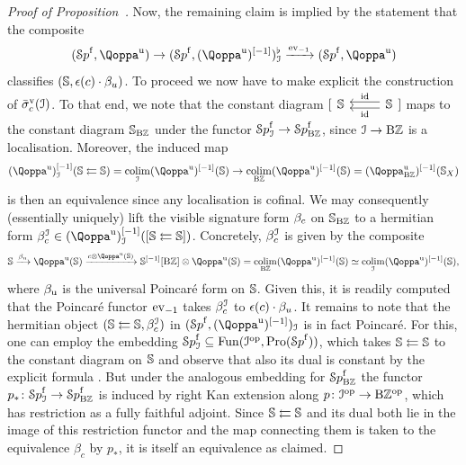 \begin{proof}[Proof of Proposition~]
Now, the remaining claim is implied by the statement that the
composite
\[
(\Spaf,\QF^\uni) \to (\Spaf,(\QF^\uni)\qshift{-1})_\I^\flat \xrightarrow{\ev_{-1}} (\Spaf,\QF^\uni)
\]
classifies $(\mathbb{S},\epsilon(c)\cdot \beta_u)$. To proceed we now have to make explicit the construction of $\bar{\sigma}^{\mathrm{v}}_c(\mathcal{I})$.
To that end, we note that the constant diagram $[\begin{tikzcd} \SS & \SS \ar[l,shift left,"\id"] \ar[l, shift right,"\id"'] \end{tikzcd}]$
maps to 
the constant diagram $\mathbb{S}_{\mathrm{B}\mathbb{Z}}$ under the functor ${\mathcal Sp}^{\mathrm{f}}_{\mathcal{I}} \to {\mathcal Sp}^{\mathrm{f}}_{\mathrm{B}\mathbb{Z}}$, since $\mathcal{I} \to \mathrm{B}\mathbb{Z}$ is a localisation. %
Moreover, the induced map
\[
(\QF^{\uni})\qshift{-1}_\I(\SS \leftleftarrows \SS) =  \colim_\I (\QF^{\uni})\qshift{-1}(\SS) \to  \colim_{\B\ZZ}(\QF^{\uni})\qshift{-1}(\SS) = (\QF^{\uni}_{\B\ZZ})\qshift{-1}(\SS_X)
\]
is then an equivalence since any localisation is cofinal. %
We may consequently (essentially uniquely) lift the visible signature form $\beta_{c}$ on $\mathbb{S}_{\mathrm{B}\mathbb{Z}}$ to a hermitian form $\bet^\I_c \in (\QF^{\uni})\qshift{-1}_\I([\SS \leftleftarrows \SS])$. Concretely, $\beta^{\mathcal{I}}_c$ is given by the composite
\begin{equation}
\label{equation:beta-I-c}%
\SS \xrightarrow{\bet_{\uni}} \QF^{\uni}(\SS) \xrightarrow{c\otimes \QF^{\uni}(\SS)} \SS\qshift{-1}[\B\ZZ] \otimes \QF^{\uni}(\SS) = \colim_{\B\ZZ} (\QF^{\uni})\qshift{-1}(\SS) \simeq \colim_{\I} (\QF^{\uni})\qshift{-1}(\SS),
\end{equation}
where $\beta_{\mathrm{u}}$ is the universal Poincaré form on $\mathbb{S}$. Given this, it is readily computed that the Poincar\'e functor $\mathrm{ev}_{-1}$ takes $\beta_c^{\mathcal{I}}$ to $\epsilon(c)\cdot \beta_u$.
It remains to note that the hermitian object $(\mathbb{S} \leftleftarrows \mathbb{S},\beta^{\mathcal{I}}_c)$ in $(\Spaf,(\QF^{\uni})\qshift{-1})_\I$ is in fact Poincar\'e. For this, one can employ the embedding ${\mathcal Sp}^{\mathrm{f}}_{\mathcal{I}} \subseteq \operatorname{Fun}(\mathcal{I}^\mathrm{op},\operatorname{Pro}({\mathcal Sp}^{\mathrm{f}}))$, which takes $\mathbb{S} \leftleftarrows \mathbb{S}$ to the constant diagram on $\mathbb{S}$ and observe that also its dual is constant by the explicit formula . But under the analogous embedding for ${\mathcal Sp}^{\mathrm{f}}_{\mathrm{B}\mathbb{Z}}$ the functor $p_* \colon {\mathcal Sp}^{\mathrm{f}}_{\mathcal{I}} \rightarrow {\mathcal Sp}^{\mathrm{f}}_{\mathrm{B}\mathbb{Z}}$ is induced by right Kan extension along $p\colon \mathcal{I}^\mathrm{op} \to \mathrm{B}\mathbb{Z}^\mathrm{op}$, which has restriction as a fully faithful adjoint. Since $\mathbb{S} \leftleftarrows \mathbb{S}$ and its dual both lie in the image of this restriction functor and the map connecting them is taken to the equivalence $\beta_c$ by $p_*$, it is itself an equivalence as claimed.
\end{proof}



